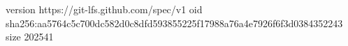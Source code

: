 version https://git-lfs.github.com/spec/v1
oid sha256:aa5764c5c700dc582d0c8dfd593855225f17988a76a4e7926f6f3d0384352243
size 202541

